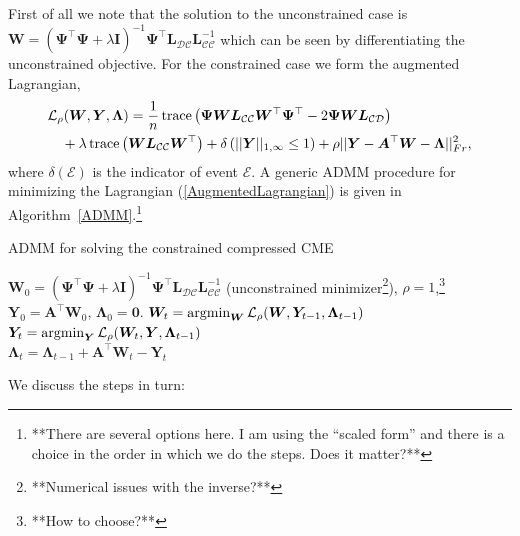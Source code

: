 \documentclass[letterpaper]{article}
\newcommand{\BoydADMM}{DBLP:journals/ftml/BoydPCPE11}
\newcommand{\cD}{{\mathcal D}}
\newcommand{\cC}{{\mathcal C}}
\newcommand{\cL}{{\mathcal L}}
\newcommand{\cE}{{\mathcal E}}
\newcommand{\bLambda}{{\bm \Lambda}}
\newcommand{\bZero}{{\bm 0}}
\newcommand{\bL}{{\bm L}}
\newcommand{\bW}{{\bm W}}
\newcommand{\bA}{{\bm A}}
\newcommand{\bI}{{\bm I}}
\newcommand{\bY}{{\bm Y}}
\newcommand{\bPsi}{{\bm \Psi}}
\newcommand{\argmin}{\operatornamewithlimits{argmin}}
\newcommand{\trace}{\operatornamewithlimits{trace}}
\newcommand{\nn}{\nonumber}
\begin{document}
First of all we note that the solution to the unconstrained case is $\bW = (\bPsi^\top \bPsi + \lambda \bI)^{-1} \bPsi^\top \bL_{\cD\cC}\bL_{\cC\cC}^{-1}$ which can be seen by differentiating the unconstrained objective. For the constrained case we form the augmented Lagrangian,
\begin{align}
&\cL_\rho(\bW,\bY,\bLambda) = \frac{1}{n} \trace\left( \bPsi \bW \bL_{\cC\cC} \bW^\top \bPsi^\top - 2\bPsi\bW\bL_{\cC\cD}  \right) \nn\\
&\quad + \lambda  \trace\left(\bW \bL_{\cC\cC} \bW^\top\right) + \delta\left( ||\bY||_{1,\infty} \le 1 \right) + \rho||\bY-\bA^\top\bW-\bLambda||^2_{Fr}, \label{AugmentedLagrangian}
\end{align}
where $\delta(\cE)$ is the indicator of event $\cE$. A generic ADMM procedure \citep{\BoydADMM} for minimizing the Lagrangian (\ref{AugmentedLagrangian}) is given in Algorithm~\ref{ADMM}.\footnote{**There are several options here. I am using the ``scaled form'' and there is a choice in the order in which we do the steps. Does it matter?**}\begin{algorithm}[tb]
   \caption{ADMM for solving the constrained compressed CME}
   \label{ADMM}
\begin{algorithmic}
	  $\bW_0 = (\bPsi^\top \bPsi + \lambda \bI)^{-1} \bPsi^\top \bL_{\cD\cC}\bL_{\cC\cC}^{-1}$ (unconstrained minimizer\footnote{**Numerical issues with the inverse?**}), $\rho = 1$,\footnote{**How to choose?**} $\bY_0 = \bA^\top \bW_0$, $\bLambda_0 = \bZero$.
	  $\bW_t = \argmin_{\bW} \cL_\rho(\bW,\bY_{t-1},\bLambda_{t-1})$\\
	  $\bY_t = \argmin_{\bY} \cL_\rho(\bW_t,\bY,\bLambda_{t-1})$ \\
    $\bLambda_t = \bLambda_{t-1} + \bA^\top\bW_t - \bY_t$ \\
	 \ENDFOR
\end{algorithmic}
\end{algorithm}

We discuss the steps in turn:
\end{document}
